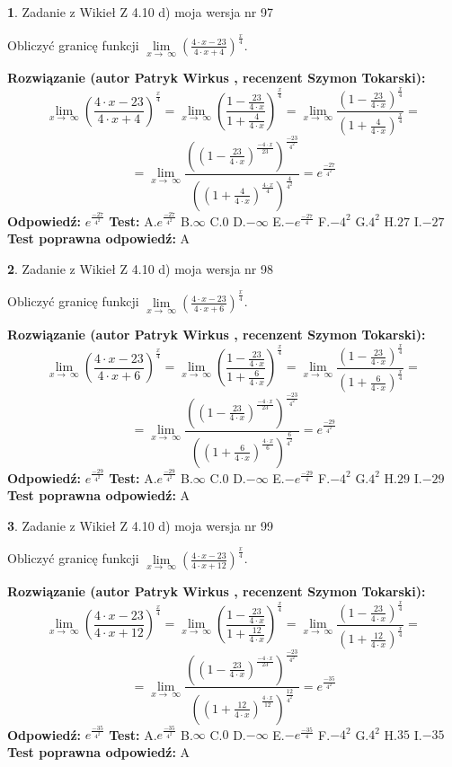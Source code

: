 \documentclass[12pt, a4paper]{article}
\theoremstyle{definition} %
\newtheorem{zad}{}
\newcommand{\zadStart}[1]{\begin{zad}#1\newline}
\newcommand{\zadStop}{\end{zad}}
\newcommand{\rozwStart}[2]{\noindent \textbf{Rozwiązanie (autor #1 , recenzent #2): }\newline}
\newcommand{\rozwStop}{\newline}
\newcommand{\odpStart}{\noindent \textbf{Odpowiedź:}\newline}
\newcommand{\odpStop}{\newline}
\newcommand{\testStart}{\noindent \textbf{Test:}\newline}
\newcommand{\testStop}{\newline}
\newcommand{\kluczStart}{\noindent \textbf{Test poprawna odpowiedź:}\newline}
\newcommand{\kluczStop}{\newline}
\begin{document}
\zadStart{Zadanie z Wikieł Z 4.10 d) moja wersja nr 97}


Obliczyć granicę funkcji  $\lim\limits_{x\to\ \infty}(\frac{4\cdot x-23}{4\cdot x+4})^{\frac{x}{4}}$.
\zadStop
\rozwStart{Patryk Wirkus}{Szymon Tokarski}
$$\lim\limits_{x\to\ \infty}(\frac{4\cdot x-23}{4\cdot x+4})^{\frac{x}{4}} = \lim\limits_{x\to\ \infty}(\frac{1-\frac{23}{4\cdot x}}{1+\frac{4}{4\cdot x}})^{\frac{x}{4}}=\lim\limits_{x\to\ \infty}\frac{(1-\frac{23}{4\cdot x})^{\frac{x}{4}}}{(1+\frac{4}{4\cdot x})^{\frac{x}{4}}}=$$
$$=\lim\limits_{x\to\ \infty}\frac{((1-\frac{23}{4\cdot x})^{\frac{-4\cdot x}{23}})^{\frac{-23}{4^{2}}}}{((1+\frac{4}{4\cdot x})^{\frac{4\cdot x}{4}})^{\frac{4}{4^{2}}}}=e^{\frac{-27}{4^{2}}}$$
\rozwStop
\odpStart
$e^{\frac{-27}{4^{2}}}$
\odpStop
\testStart
A.$e^{\frac{-27}{4^{2}}}$ B.$\infty$ C.$0$ D.$-\infty$ E.$-e^{\frac{-27}{4}}$
F.$-4^{2}$ G.$4^{2}$
H.$27$
I.$-27$
\testStop
\kluczStart
A
\kluczStop



\zadStart{Zadanie z Wikieł Z 4.10 d) moja wersja nr 98}


Obliczyć granicę funkcji  $\lim\limits_{x\to\ \infty}(\frac{4\cdot x-23}{4\cdot x+6})^{\frac{x}{4}}$.
\zadStop
\rozwStart{Patryk Wirkus}{Szymon Tokarski}
$$\lim\limits_{x\to\ \infty}(\frac{4\cdot x-23}{4\cdot x+6})^{\frac{x}{4}} = \lim\limits_{x\to\ \infty}(\frac{1-\frac{23}{4\cdot x}}{1+\frac{6}{4\cdot x}})^{\frac{x}{4}}=\lim\limits_{x\to\ \infty}\frac{(1-\frac{23}{4\cdot x})^{\frac{x}{4}}}{(1+\frac{6}{4\cdot x})^{\frac{x}{4}}}=$$
$$=\lim\limits_{x\to\ \infty}\frac{((1-\frac{23}{4\cdot x})^{\frac{-4\cdot x}{23}})^{\frac{-23}{4^{2}}}}{((1+\frac{6}{4\cdot x})^{\frac{4\cdot x}{6}})^{\frac{6}{4^{2}}}}=e^{\frac{-29}{4^{2}}}$$
\rozwStop
\odpStart
$e^{\frac{-29}{4^{2}}}$
\odpStop
\testStart
A.$e^{\frac{-29}{4^{2}}}$ B.$\infty$ C.$0$ D.$-\infty$ E.$-e^{\frac{-29}{4}}$
F.$-4^{2}$ G.$4^{2}$
H.$29$
I.$-29$
\testStop
\kluczStart
A
\kluczStop



\zadStart{Zadanie z Wikieł Z 4.10 d) moja wersja nr 99}


Obliczyć granicę funkcji  $\lim\limits_{x\to\ \infty}(\frac{4\cdot x-23}{4\cdot x+12})^{\frac{x}{4}}$.
\zadStop
\rozwStart{Patryk Wirkus}{Szymon Tokarski}
$$\lim\limits_{x\to\ \infty}(\frac{4\cdot x-23}{4\cdot x+12})^{\frac{x}{4}} = \lim\limits_{x\to\ \infty}(\frac{1-\frac{23}{4\cdot x}}{1+\frac{12}{4\cdot x}})^{\frac{x}{4}}=\lim\limits_{x\to\ \infty}\frac{(1-\frac{23}{4\cdot x})^{\frac{x}{4}}}{(1+\frac{12}{4\cdot x})^{\frac{x}{4}}}=$$
$$=\lim\limits_{x\to\ \infty}\frac{((1-\frac{23}{4\cdot x})^{\frac{-4\cdot x}{23}})^{\frac{-23}{4^{2}}}}{((1+\frac{12}{4\cdot x})^{\frac{4\cdot x}{12}})^{\frac{12}{4^{2}}}}=e^{\frac{-35}{4^{2}}}$$
\rozwStop
\odpStart
$e^{\frac{-35}{4^{2}}}$
\odpStop
\testStart
A.$e^{\frac{-35}{4^{2}}}$ B.$\infty$ C.$0$ D.$-\infty$ E.$-e^{\frac{-35}{4}}$
F.$-4^{2}$ G.$4^{2}$
H.$35$
I.$-35$
\testStop
\kluczStart
A
\kluczStop
\end{document}
